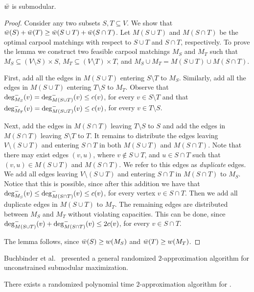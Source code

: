 \begin{lemma}
$\barw$ is submodular.
\end{lemma}
\begin{proof}
Consider any two subsets $S, T \subseteq V$.  We show that $\barw(S)
+ \barw(T) \geq \barw(S \cup T) + \barw(S \cap T)$.
%
Let $M(S \cup T)$ and $M(S \cap T)$ be the optimal carpool matchings
with respect to $S \cup T$ and $S \cap T$, respectively.
%
To prove the lemma we construct two feasible carpool matchings $M_S$
and $M_T$ such that $M_S \subseteq (V \setminus S) \times S$,
$M_T \subseteq (V \setminus T) \times T$, and $M_S \cup M_T = M(S \cup
T) \cup M(S \cap T)$.

First, add all the edges in $M(S \cup T)$ entering $S \setminus T$ to
$M_S$.  Similarly, add all the edges in $M(S \cup T)$ entering
$T \setminus S$ to $M_T$.  Observe that $\din[M_S](v) = \din[M(S \cup
T)](v) \leq c(v)$, for every $v \in S \setminus T$ and that
$\din[M_T](v) = \din[M(S \cup T)](v) \leq c(v)$, for every $v \in
T \setminus S$.

Next, add the edges in $M(S \cap T)$ leaving $T \setminus S$ to $S$
and add the edges in $M(S \cap T)$ leaving $S \setminus T$ to $T$.
%
It remains to distribute the edges leaving $V \setminus (S \cup T)$
and entering $S \cap T$ in both $M(S \cup T)$ and $M(S \cap T)$.  Note
that there may exist edges $(v,u)$, where $v \not\in S \cup T$, and
$u \in S \cap T$ such that $(v,u) \in M(S \cup T)$ and $M(S \cap T)$.
We refer to this edges as \emph{duplicate} edges.
%
We add all edges leaving $V \setminus (S \cup T)$ and entering $S \cap
T$ in $M(S \cap T)$ to $M_S$.  Notice that this is possible, since
after this addition we have that $\din[M_S](v) \leq \din[M(S \cap
T)](v) \leq c(v)$, for every vertex $v \in S \cap T$.
%
Then we add all duplicate edges in $M(S \cup T)$ to $M_T$.
%
The remaining edges are distributed between $M_S$ and $M_T$ without
violating capacities.  This can be done, since $\din[M(S \cup T)](v)
+ \din[M(S \cap T)](v) \leq 2c(v)$, for every $v \in S \cap T$.

The lemma follows, since $\barw(S) \geq w(M_S)$ and $\barw(T) \geq
w(M_T)$.
\end{proof}

Buchbinder et al.~\cite{BFNS15} presented a general randomized
$2$-approximation algorithm for unconstrained submodular maximization.

\begin{theorem}
There exists a randomized polynomial time $2$-approximation algorithm
for \carpool.
\end{theorem}
